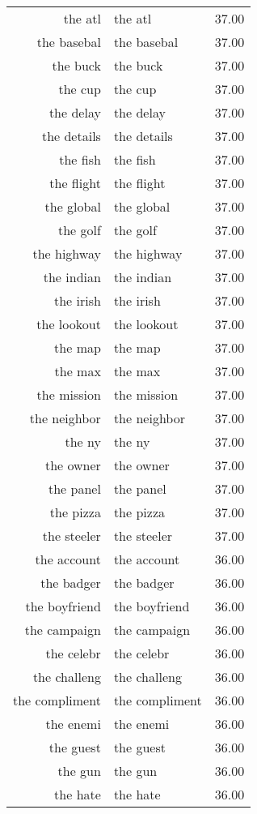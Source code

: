 \begin{table}[ht]
\begin{tabular}{rlr}
  the atl & the atl & 37.00 \\ 
  the basebal & the basebal & 37.00 \\ 
  the buck & the buck & 37.00 \\ 
  the cup & the cup & 37.00 \\ 
  the delay & the delay & 37.00 \\ 
  the details & the details & 37.00 \\ 
  the fish & the fish & 37.00 \\ 
  the flight & the flight & 37.00 \\ 
  the global & the global & 37.00 \\ 
  the golf & the golf & 37.00 \\ 
  the highway & the highway & 37.00 \\ 
  the indian & the indian & 37.00 \\ 
  the irish & the irish & 37.00 \\ 
  the lookout & the lookout & 37.00 \\ 
  the map & the map & 37.00 \\ 
  the max & the max & 37.00 \\ 
  the mission & the mission & 37.00 \\ 
  the neighbor & the neighbor & 37.00 \\ 
  the ny & the ny & 37.00 \\ 
  the owner & the owner & 37.00 \\ 
  the panel & the panel & 37.00 \\ 
  the pizza & the pizza & 37.00 \\ 
  the steeler & the steeler & 37.00 \\ 
  the account & the account & 36.00 \\ 
  the badger & the badger & 36.00 \\ 
  the boyfriend & the boyfriend & 36.00 \\ 
  the campaign & the campaign & 36.00 \\ 
  the celebr & the celebr & 36.00 \\ 
  the challeng & the challeng & 36.00 \\ 
  the compliment & the compliment & 36.00 \\ 
  the enemi & the enemi & 36.00 \\ 
  the guest & the guest & 36.00 \\ 
  the gun & the gun & 36.00 \\ 
  the hate & the hate & 36.00 \\ 

\end{tabular}
\end{table}
